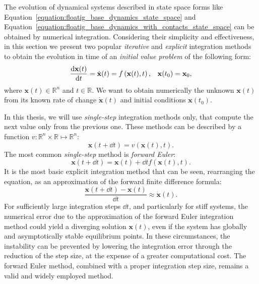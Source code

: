 The evolution of dynamical systems described in state space forms like Equation~\eqref{equation:floatig_base_dynamics_state_space} and Equation~\eqref{equation:floatig_base_dynamics_with_contacts_state_space} can be obtained by numerical integration.
Considering their simplicity and effectiveness, in this section we present two popular \emph{iterative} and \emph{explicit} integration methods to obtain the evolution in time of an \emph{initial value problem} of the following form:
%
\begin{align*}
    \dv{\mathbf{x}(t)}{t} = \dot{\mathbf{x}}(t) = f\left(\mathbf{x}(t), t\right),
    &&
    \mathbf{x}(t_0) = \mathbf{x}_0
    ,
\end{align*}
%
where $\mathbf{x}(t) \in \mathbb{R}^n$ and $t \in \mathbb{R}$.
We want to obtain numerically the unknown $\mathbf{x}(t)$ from its known rate of change $\dot{\mathbf{x}}(t)$ and initial conditions $\mathbf{x}(t_0)$.

In this thesis, we will use \emph{single-step} integration methods only, that compute the next value only from the previous one.
These methods can be described by a function $v: \mathbb{R}^n \times \mathbb{R} \mapsto \mathbb{R}^n$:
%
\begin{equation*}
    \mathbf{x}(t + \dd{t}) = v\left(\mathbf{x}(t), t\right) .
\end{equation*}
%
The most common \emph{single-step} method is \emph{forward Euler}:
%
\begin{equation*}
    \mathbf{x}(t + \dd{t}) = \mathbf{x}(t) + \dd{t} f\left(\mathbf{x}(t), t\right)
    .
\end{equation*}
%
It is the most basic explicit integration method that can be seen, rearranging the equation, as an approximation of the forward finite difference formula:
%
\begin{equation*}
    \frac{\mathbf{x}(t + \dd{t}) - \mathbf{x}(t)}{\dd{t}} \approx \dot{\mathbf{x}}(t)
    .
\end{equation*}
%
For sufficiently large integration steps $\dd{t}$, and particularly for stiff systems, the numerical error due to the approximation of the forward Euler integration method could yield a diverging solution $\mathbf{x}(t)$, even if the system has globally and asymptotically stable equilibrium points.
In these circumstances, the instability can be prevented by lowering the integration error through the reduction of the step size, at the expense of a greater computational cost.
The forward Euler method, combined with a proper integration step size, remains a valid and widely employed method.

